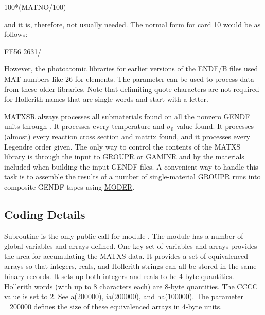 \newpage
\small
\begin{ccode}

  100*(MATNO/100)

\end{ccode}
\normalsize

\noindent
and it is, therefore, not usually needed.  The normal form
for card 10 would be as follows:

\small
\begin{ccode}

  FE56  2631/

\end{ccode}
\normalsize

However, the photoatomic libraries for earlier versions of the
ENDF/B files used MAT numbers like 26 for elements.  The 
parameter can be used to process data from these older libraries.
Note that delimiting quote characters are not required for Hollerith
names that are single words and start with a letter.

MATXSR always processes all
submaterials found on all the nonzero GENDF
units  through .  It processes every
temperature and $\sigma_0$ value found.  It processes (almost) every
reaction cross section and matrix found, and it processes every Legendre
order given.  The only way to control the contents of the MATXS library
is through the input to \hyperlink{sGROUPRhy}{GROUPR} or
\hyperlink{sGAMINRhy}{GAMINR} and by the materials included
when building the input GENDF files.  A convenient way to handle
this task is to assemble the results of a number of single-material
\hyperlink{sGROUPRhy}{GROUPR} runs into composite
GENDF tapes using \hyperlink{sMODERhy}{MODER}.

\subsection{Coding Details}
\label{ssMATXSR_details}

Subroutine  is the only public call for module
.  The module has a number of global variables and
arrays defined.  One key set of variables and arrays provides the
area for accumulating the MATXS data.  It provides a set of
equivalenced arrays so that integers, reals, and Hollerith strings
can all be stored in the same binary records.  It sets up both
integers and reals to be 4-byte quantities.  Hollerith words
(with up to 8 characters each) are 8-byte quantities.  The CCCC
 value is set to 2.  See a(200000), ia(200000), and
ha(100000).  The parameter =200000 defines the size of
these equivalenced arrays in 4-byte units.

